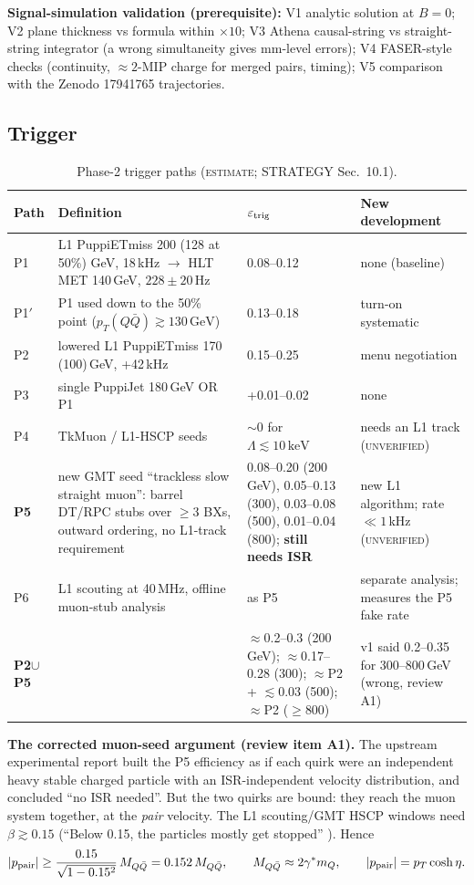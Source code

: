 \documentclass[11pt,a4paper]{article}
\newcommand{\EST}{\textsc{estimate}}
\newcommand{\UNV}{\textsc{unverified}}
\newcommand{\mQ}{m_Q}
\newcommand{\GeV}{\,\mathrm{GeV}}
\newcommand{\keV}{\,\mathrm{keV}}
\newcommand{\pTQQ}{p_T(Q\bar Q)}
\begin{document}
\textbf{Signal-simulation validation (prerequisite):} V1 analytic solution at $B=0$; V2 plane thickness vs formula within $\times10$; V3 Athena causal-string vs straight-string integrator (a wrong simultaneity gives mm-level errors); V4 FASER-style checks (continuity, $\approx2$-MIP charge for merged pairs, timing); V5 comparison with the Zenodo 17941765 trajectories.

\subsection{Trigger}\label{sec:trigger}
{\small
\begin{longtable}{@{}L{1.23cm}L{6.57cm}L{4.00cm}L{4.31cm}@{}}
\caption{Phase-2 trigger paths (\EST; STRATEGY Sec.~10.1).}\label{tab:trig}\\
\toprule Path & Definition & $\varepsilon_{\rm trig}$ & New development\\\midrule\endfirsthead
\bottomrule\endfoot
P1 & L1 PuppiETmiss 200 (128 at 50\%) GeV, 18\,kHz $\to$ HLT MET 140\,GeV, $228\pm20$\,Hz & 0.08--0.12 & none (baseline)\\
P1$'$ & P1 used down to the 50\% point ($\pTQQ\gtrsim130\GeV$) & 0.13--0.18 & turn-on systematic\\
P2 & lowered L1 PuppiETmiss 170 (100)\,GeV, +42\,kHz & 0.15--0.25 & menu negotiation\\
P3 & single PuppiJet 180\,GeV OR P1 & +0.01--0.02 & none\\
P4 & TkMuon / L1-HSCP seeds & $\sim$0 for $\Lambda\lesssim10\keV$ & needs an L1 track (\UNV)\\
\textbf{P5} & new GMT seed ``trackless slow straight muon'': barrel DT/RPC stubs over $\geq3$ BXs, outward ordering, no L1-track requirement & 0.08--0.20 (200\,GeV), 0.05--0.13 (300), 0.03--0.08 (500), 0.01--0.04 (800); \textbf{still needs ISR} & new L1 algorithm; rate $\ll1$\,kHz (\UNV)\\
P6 & L1 scouting at 40\,MHz, offline muon-stub analysis & as P5 & separate analysis; measures the P5 fake rate\\
\textbf{P2$\cup$P5} & & $\approx$0.2--0.3 (200\,GeV); $\approx$0.17--0.28 (300); $\approx$P2 + $\lesssim$0.03 (500); $\approx$P2 ($\geq$800) & v1 said 0.2--0.35 for 300--800\,GeV (wrong, review A1)\\
\end{longtable}
}

\textbf{The corrected muon-seed argument (review item A1).} The upstream experimental report built the P5 efficiency as if each quirk were an independent heavy stable charged particle with an ISR-independent velocity distribution, and concluded ``no ISR needed''. But the two quirks are bound: they reach the muon system together, at the \emph{pair} velocity. The L1 scouting/GMT HSCP windows need $\beta\gtrsim0.15$ (``Below 0.15, the particles mostly get stopped'' \cite{L1DS}). Hence
\begin{equation}
|p_{\rm pair}|\geq\frac{0.15}{\sqrt{1-0.15^2}}\,M_{Q\bar Q}=0.152\,M_{Q\bar Q},\qquad M_{Q\bar Q}\approx2\gamma^*\mQ,\qquad |p_{\rm pair}|=p_T\cosh\eta .
\end{equation}
\end{document}
